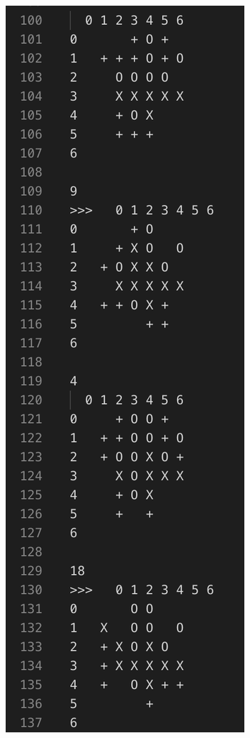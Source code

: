 \documentclass[a4paper]{article}
\begin{document}
\begin{figure}[!hbt]
\begin{minipage}{0.4\textwidth}
    \includegraphics[width=\linewidth]{assets/ape0.png}

\end{minipage}
\end{figure}
\end{document}
